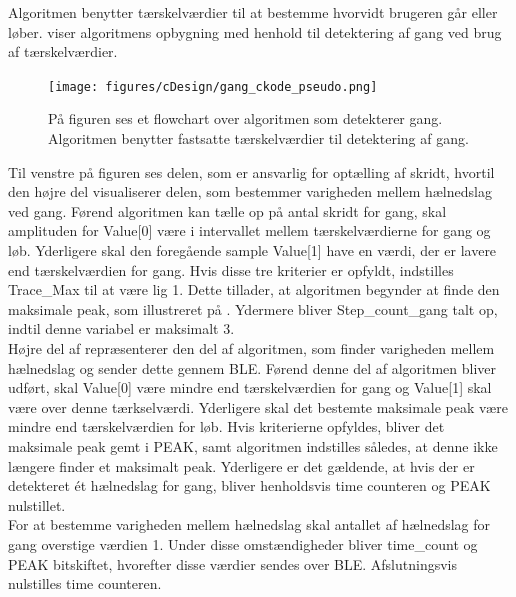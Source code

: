 Algoritmen benytter tærskelværdier til at bestemme hvorvidt brugeren går eller løber.  viser algoritmens opbygning med henhold til detektering af gang ved brug af tærskelværdier.
\begin{figure}[H]
	\centering
	\texttt{[image: figures/cDesign/gang\_ckode\_pseudo.png]}
	\caption{På figuren ses et flowchart over algoritmen som detekterer gang. Algoritmen benytter fastsatte tærskelværdier til detektering af gang.}
	\label{fig:gang_pseudo}
\end{figure} \vspace{-0.5cm}
Til venstre på figuren ses delen, som er ansvarlig for optælling af skridt, hvortil den højre del visualiserer delen, som bestemmer varigheden mellem hælnedslag ved gang. Førend algoritmen kan tælle op på antal skridt for gang, skal amplituden for Value[0] være i intervallet mellem tærskelværdierne for gang og løb. Yderligere skal den foregående sample Value[1] have en værdi, der er lavere end tærskelværdien for gang. Hvis disse tre kriterier er opfyldt, indstilles Trace\_Max til at være lig 1. Dette tillader, at algoritmen begynder at finde den maksimale peak, som illustreret på . Ydermere bliver Step\_count\_gang talt op, indtil denne variabel er maksimalt 3. \\
Højre del af  repræsenterer den del af algoritmen, som finder varigheden mellem hælnedslag og sender dette gennem BLE. Førend denne del af algoritmen bliver udført, skal Value[0] være mindre end tærskelværdien for gang og Value[1] skal være over denne tærkselværdi. Yderligere skal det bestemte maksimale peak være mindre end tærskelværdien for løb. Hvis kriterierne opfyldes, bliver det maksimale peak gemt i PEAK, samt algoritmen indstilles således, at denne ikke længere finder et maksimalt peak. Yderligere er det gældende, at hvis der er detekteret ét hælnedslag for gang, bliver henholdsvis time counteren og PEAK nulstillet. \\
For at bestemme varigheden mellem hælnedslag skal antallet af hælnedslag for gang overstige værdien 1. Under disse omstændigheder bliver time\_count og PEAK bitskiftet, hvorefter disse værdier sendes over BLE. Afslutningsvis nulstilles time counteren.

